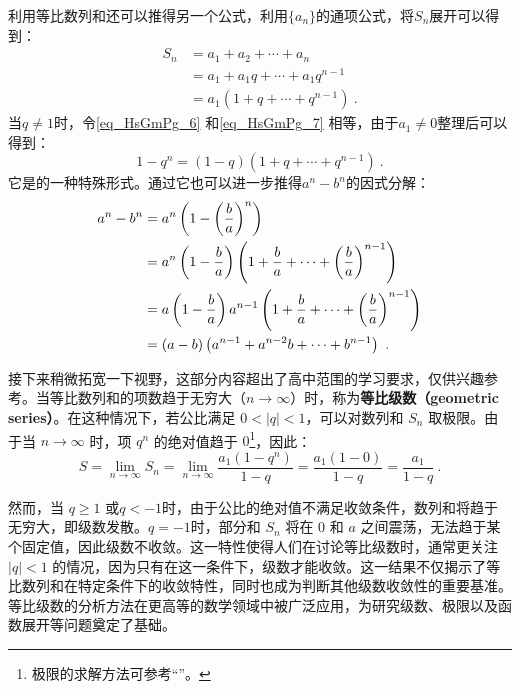 利用等比数列和还可以推得另一个公式，利用$\{a_n\}$的通项公式，将$S_n$展开可以得到：
\begin{equation}\label{eq_HsGmPg_7}
\begin{aligned}
S_n& = a_1 + a_2 + \cdots + a_n \\
&= a_1+a_1q+ \cdots + a_1q^{n-1}\\
&= a_1(1+q+ \cdots +q^{n-1})~.
\end{aligned}
\end{equation}
当$q\neq1$时，令\autoref{eq_HsGmPg_6} 和\autoref{eq_HsGmPg_7} 相等，由于$a_1\neq0$整理后可以得到：
\begin{equation}
1 - q^n=(1-q)(1+q+ \cdots +q^{n-1})~.
\end{equation}
它是的一种特殊形式。通过它也可以进一步推得$a^n-b^n$的因式分解：
\begin{equation}
\begin{aligned}
a^n-b^n& = a^n\left(1-\left({b\over a}\right)^n\right)\\
&= a^n\left(1-{b\over a}\right)\left(1+{b\over a}+\cdots+\left({b\over a}\right)^{n-1}\right)\\
&= a\left(1-{b\over a}\right)a^{n-1}\left(1+{b\over a}+\cdots+\left({b\over a}\right)^{n-1}\right)\\
&= \left(a-b\right)\left(a^{n-1}+a^{n-2}b+\cdots+b^{n-1}\right)~.
\end{aligned}
\end{equation}

接下来稍微拓宽一下视野，这部分内容超出了高中范围的学习要求，仅供兴趣参考。当等比数列和的项数趋于无穷大（$n \to \infty$）时，称为\textbf{等比级数（geometric series）}。在这种情况下，若公比满足 $0 < |q| < 1$，可以对数列和 $S_n$ 取极限。由于当 $n \to \infty$ 时，项 $q^n$ 的绝对值趋于 $0$\footnote{极限的求解方法可参考“”。}，因此：
\begin{equation}
S = \lim_{n \to \infty} S_n = \lim_{n \to \infty} \frac{a_1(1 - q^n)}{1 - q} = \frac{a_1(1 - 0)}{1 - q} = \frac{a_1}{1 - q}~.
\end{equation}

然而，当 $q \geq 1$ 或$q<-1$时，由于公比的绝对值不满足收敛条件，数列和将趋于无穷大，即级数发散。$q=-1$时，部分和  $S_n$  将在  $0$  和  $a$  之间震荡，无法趋于某个固定值，因此级数不收敛。这一特性使得人们在讨论等比级数时，通常更关注 $|q| < 1$ 的情况，因为只有在这一条件下，级数才能收敛。这一结果不仅揭示了等比数列和在特定条件下的收敛特性，同时也成为判断其他级数收敛性的重要基准。等比级数的分析方法在更高等的数学领域中被广泛应用，为研究级数、极限以及函数展开等问题奠定了基础。